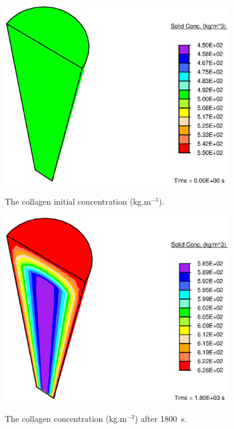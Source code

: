 \begin{figure}[ht]
  \centering
     {\includegraphics[width=10.00cm]{images/before-growth.eps}}
     \caption{The collagen initial concentration (kg.m$^{-3}$).}
     \label{before_growth}
\end{figure}

\begin{figure}[ht]
  \centering
     {\includegraphics[width=10.00cm]{images/after-growth.eps}}
     \caption{The collagen concentration (kg.m$^{-3}$) after 1800~s.}
     \label{after_growth}
\end{figure}

